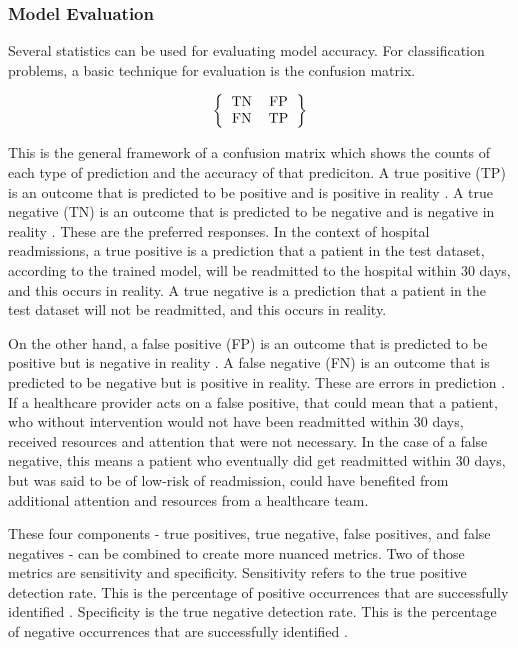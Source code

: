 \documentclass[sigconf]{acmart}
\begin{document}
\subsubsection{Model Evaluation}

Several statistics can be used for evaluating model accuracy. For classification problems, a basic technique for evaluation is the confusion matrix.

\[ 
\left \{
  \begin{tabular}{ccc}
  TN & FP \\
  FN & TP 
  \end{tabular}
\right \}
\]

This is the general framework of a confusion matrix which shows the counts of each type of prediction and the accuracy of that prediciton. A true positive (TP) is an outcome that is predicted to be positive and is positive in reality \cite{cite12}. A true negative (TN) is an outcome that is predicted to be negative and is negative in reality \cite{cite12}. These are the preferred responses. In the context of hospital readmissions, a true positive is a prediction that a patient in the test dataset, according to the trained model, will be readmitted to the hospital within 30 days, and this occurs in reality. A true negative is a prediction that a patient in the test dataset will not be readmitted, and this occurs in reality.

On the other hand, a false positive (FP) is an outcome that is predicted to be positive but is negative in reality \cite{cite12}. A false negative (FN) is an outcome that is predicted to be negative but is positive in reality. These are errors in prediction \cite{cite12}. If a healthcare provider acts on a false positive, that could mean that a patient, who without intervention would not have been readmitted within 30 days, received resources and attention that were not necessary. In the case of a false negative, this means a patient who eventually did get readmitted within 30 days, but was said to be of low-risk of readmission, could have benefited from additional attention and resources from a healthcare team.

These four components - true positives, true negative, false positives, and false negatives - can be combined to create more nuanced metrics. Two of those metrics are sensitivity and specificity. Sensitivity refers to the true positive detection rate. This is the percentage of positive occurrences that are successfully identified \cite{cite12}. Specificity is the true negative detection rate. This is the percentage of negative occurrences that are successfully identified \cite{cite12}.
\end{document}
